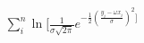 \documentclass[preview]{standalone}
\begin{document}
\begin{align*}
\sum_i^n \ln [ \frac{1}{\sigma \sqrt{2 \pi}} e^{-\frac{1}{2}\left(\frac{y_i -\omega x_i}{\sigma}\right)^2 ]}
\end{align*}
\end{document}
